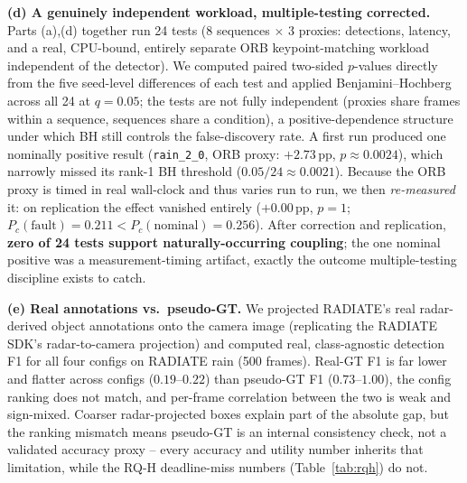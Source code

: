 \documentclass[conference]{IEEEtran}
\begin{document}
\textbf{(d) A genuinely independent workload, multiple-testing
corrected.} Parts (a),(d) together run 24 tests (8 sequences
$\times$ 3 proxies: detections, latency, and a real, CPU-bound,
entirely separate ORB keypoint-matching workload independent of the
detector). We computed paired two-sided $p$-values directly from the
five seed-level differences of each test and applied
Benjamini--Hochberg across all 24 at $q{=}0.05$; the tests are not
fully independent (proxies share frames within a sequence, sequences
share a condition), a positive-dependence structure under which BH
still controls the false-discovery rate. A first run produced one
nominally positive result (\texttt{rain\_2\_0}, ORB proxy:
$+2.73$\,pp, $p{\approx}0.0024$), which narrowly missed its rank-1 BH
threshold ($0.05/24{\approx}0.0021$). Because the ORB proxy is timed
in real wall-clock and thus varies run to run, we then
\emph{re-measured} it: on replication the effect vanished entirely
($+0.00$\,pp, $p{=}1$; $P_c(\text{fault}){=}0.211 <
P_c(\text{nominal}){=}0.256$). After correction and replication,
\textbf{zero of 24 tests support naturally-occurring coupling}; the
one nominal positive was a measurement-timing artifact, exactly the
outcome multiple-testing discipline exists to catch.

\textbf{(e) Real annotations vs.\ pseudo-GT.} We projected RADIATE's
real radar-derived object annotations onto the camera image
(replicating the RADIATE SDK's radar-to-camera projection) and
computed real, class-agnostic detection F1 for all four configs on
RADIATE rain (500 frames). Real-GT F1 is far lower and flatter across
configs ($0.19$--$0.22$) than pseudo-GT F1 ($0.73$--$1.00$), the
config ranking does not match, and per-frame correlation between the
two is weak and sign-mixed. Coarser radar-projected boxes explain
part of the absolute gap, but the ranking mismatch means pseudo-GT is
an internal consistency check, not a validated accuracy proxy --
every accuracy and utility number inherits that limitation, while the
RQ-H deadline-miss numbers (Table~\ref{tab:rqh}) do not.
\end{document}
